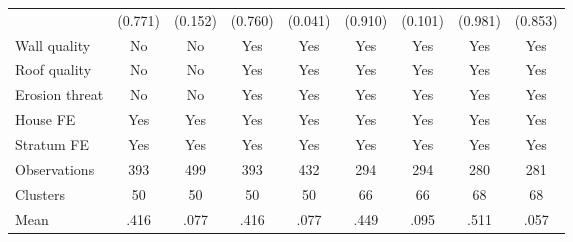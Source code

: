 {\begin{tabular}{l*{8}{c}}
                &  (0.771)         &  (0.152)         &  (0.760)         &  (0.041)         &  (0.910)         &  (0.101)         &  (0.981)         &  (0.853)         \\
Wall quality    &       No         &       No         &      Yes         &      Yes         &      Yes         &      Yes         &      Yes         &      Yes         \\
Roof quality    &       No         &       No         &      Yes         &      Yes         &      Yes         &      Yes         &      Yes         &      Yes         \\
Erosion threat  &       No         &       No         &      Yes         &      Yes         &      Yes         &      Yes         &      Yes         &      Yes         \\
House FE        &      Yes         &      Yes         &      Yes         &      Yes         &      Yes         &      Yes         &      Yes         &      Yes         \\
Stratum FE      &      Yes         &      Yes         &      Yes         &      Yes         &      Yes         &      Yes         &      Yes         &      Yes         \\
\hline
Observations    &      393         &      499         &      393         &      432         &      294         &      294         &      280         &      281         \\
Clusters        &       50         &       50         &       50         &       50         &       66         &       66         &       68         &       68         \\
Mean            &     .416         &     .077         &     .416         &     .077         &     .449         &     .095         &     .511         &     .057         \\
\hline\hline
\end{tabular}
}
